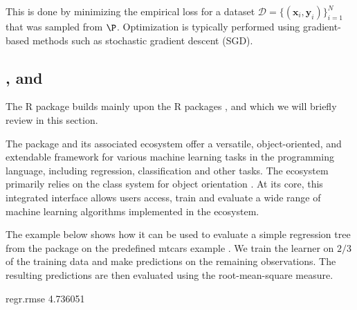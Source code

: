 \documentclass[article]{jss}
\theoremstyle{definition}
\begin{document}
This is done by minimizing the empirical loss for a dataset $\mathcal{D} = \{ (\mathbf{x}_i, \mathbf{y}_i) \}_{i=1}^N$ that was sampled from $\P$.
Optimization is typically performed using gradient-based methods such as stochastic gradient descent (SGD).

\subsection[mlr3, mlr3pipelines and torch]{,  and }

The  R package builds mainly upon the R packages  \citep{ref-mlr32019},  \citep{ref-mlr3pipelines2021} and  \citep{ref-torch2025} which we will briefly review in this section.

The  package and its associated ecosystem offer a versatile, object-oriented, and extendable framework for various machine learning tasks in the  programming language, including regression, classification and other tasks.
The ecosystem primarily relies on the  class system for object orientation \citep{ref-r6chang}.
At its core, this integrated interface allows users access, train and evaluate a wide range of machine learning algorithms implemented in the  ecosystem.

The example below shows how it can be used to evaluate a simple regression tree  from the  package \citep{ref-rpart2025} on the predefined mtcars example .
We train the learner on $2/3$ of the training data and make predictions on the remaining observations.
The resulting predictions are then evaluated using the root-mean-square measure.

\begin{CodeOutput}
regr.rmse
 4.736051
\end{CodeOutput}
\end{document}
